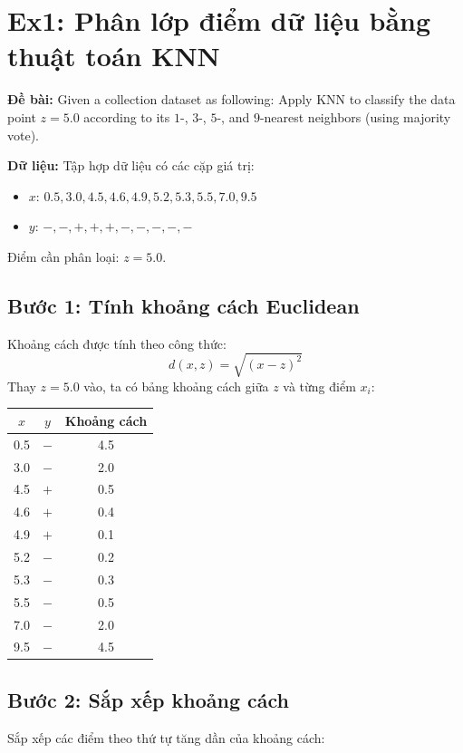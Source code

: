 \section{Ex1: Phân lớp điểm dữ liệu bằng thuật toán KNN}

\textbf{Đề bài:} Given a collection dataset as following: Apply KNN to classify the data point $z = 5.0$ according to its $1$-, $3$-, $5$-, and $9$-nearest neighbors (using majority vote).

\textbf{Dữ liệu:} Tập hợp dữ liệu có các cặp giá trị:
\begin{itemize}
    \item $x$: $0.5, 3.0, 4.5, 4.6, 4.9, 5.2, 5.3, 5.5, 7.0, 9.5$
    \item $y$: $-, -, +, +, +, -, -, -, -, -$
\end{itemize}
Điểm cần phân loại: $z = 5.0$.

\subsection*{Bước 1: Tính khoảng cách Euclidean}
Khoảng cách được tính theo công thức:
$$d(x, z) = \sqrt{(x - z)^2}$$
Thay $z = 5.0$ vào, ta có bảng khoảng cách giữa $z$ và từng điểm $x_i$:

\begin{table}[H]
    \centering
    \begin{tabular}{|c|c|c|}
        \hline
        \textbf{$x$} & \textbf{$y$} & \textbf{Khoảng cách} \\
        \hline
        0.5 & $-$ & 4.5 \\ \hline
        3.0 & $-$ & 2.0 \\ \hline
        4.5 & $+$ & 0.5 \\ \hline
        4.6 & $+$ & 0.4 \\ \hline
        4.9 & $+$ & 0.1 \\ \hline
        5.2 & $-$ & 0.2 \\ \hline
        5.3 & $-$ & 0.3 \\ \hline
        5.5 & $-$ & 0.5 \\ \hline
        7.0 & $-$ & 2.0 \\ \hline
        9.5 & $-$ & 4.5 \\ \hline
    \end{tabular}
\end{table}

\subsection*{Bước 2: Sắp xếp khoảng cách}
Sắp xếp các điểm theo thứ tự tăng dần của khoảng cách:


